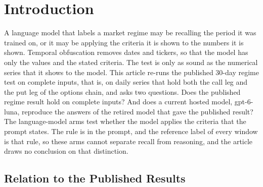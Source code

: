 \section{Introduction}
\label{sec:introduction}

A language model that labels a market regime may be recalling the period it was trained on, or it may be applying the criteria it is shown to the numbers it is shown. Temporal obfuscation removes dates and tickers, so that the model has only the values and the stated criteria. The test is only as sound as the numerical series that it shows to the model. This article re-runs the published 30-day regime test on complete inputs, that is, on daily series that hold both the call leg and the put leg of the options chain, and asks two questions. Does the published regime result hold on complete inputs? And does a current hosted model, gpt-6-luna, reproduce the answers of the retired model that gave the published result? The language-model arms test whether the model applies the criteria that the prompt states. The rule is in the prompt, and the reference label of every window is that rule, so these arms cannot separate recall from reasoning, and the article draws no conclusion on that distinction.

\subsection{Relation to the Published Results}
\label{sec:introduction:supersedes}

